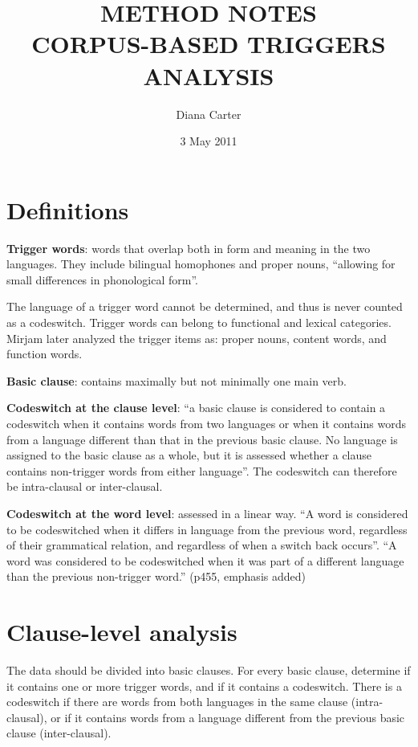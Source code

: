 \documentclass[a4paper,10pt]{article}
\title{METHOD NOTES\\CORPUS-BASED TRIGGERS ANALYSIS}
\author{Diana Carter}
\date{3 May 2011}
\begin{document}
\maketitle


\section{Definitions}

\textbf{Trigger words}: words that overlap both in form and meaning in the two languages. They include bilingual homophones and proper nouns, ``allowing for small differences in phonological form''. 

The language of a trigger word cannot be determined, and thus is never counted as a codeswitch.  Trigger words can belong to functional and lexical categories. Mirjam later analyzed the trigger items as: proper nouns, content words, and function words. 

\textbf{Basic clause}: contains maximally but not minimally one main verb.

\textbf{Codeswitch at the clause level}: ``a basic clause is considered to contain a codeswitch when it contains words from two languages or when it contains words from a language different than that in the previous basic clause. No language is assigned to the basic clause as a whole, but it is assessed whether a clause contains non-trigger words from either language''. The codeswitch can therefore be intra-clausal or inter-clausal.

\textbf{Codeswitch at the word level}: assessed in a linear way. ``A word is considered to be codeswitched when it differs in language from the previous word, regardless of their grammatical relation, and regardless of when a switch back occurs''.  ``A word was considered to be codeswitched when it was part of a different language than the previous non-trigger word.'' (p455, emphasis added)


\section{Clause-level analysis}

The data should be divided into basic clauses. For every basic clause, determine if it contains one or more trigger words, and if it contains a codeswitch. There is a codeswitch if there are words from both languages in the same clause (intra-clausal), or if it contains words from a language different from the previous basic clause (inter-clausal).
\end{document}
